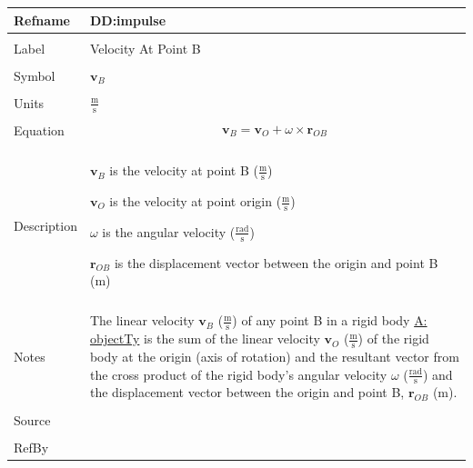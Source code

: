 \documentclass[12pt]{article}
\begin{document}
\noindent \begin{minipage}{\textwidth}
\begin{tabular}{p{} p{}}
\toprule \textbf{Refname} & \textbf{DD:impulse}
\label{DD:impulse}
\\ \midrule \\
Label & Velocity At Point B
\\ \midrule \\
Symbol & ${\mathbf{v}_{B}}$
\\ \midrule \\
Units & $\frac{\text{m}}{\text{s}}$
\\ \midrule \\
Equation & \begin{dmath}
           {\mathbf{v}_{B}}={\mathbf{v}_{O}}+ω\times{\mathbf{r}_{OB}}
           \end{dmath}
\\ \midrule \\
Description & \begin{symbDescription}
              \item{${\mathbf{v}_{B}}$ is the velocity at point B ($\frac{\text{m}}{\text{s}}$)}
              \item{${\mathbf{v}_{O}}$ is the velocity at point origin ($\frac{\text{m}}{\text{s}}$)}
              \item{$ω$ is the angular velocity ($\frac{\text{rad}}{\text{s}}$)}
              \item{${\mathbf{r}_{OB}}$ is the displacement vector between the origin and point B (m)}
              \end{symbDescription}
\\ \midrule \\
Notes & The linear velocity ${\mathbf{v}_{B}}$ ($\frac{\text{m}}{\text{s}}$) of any point B in a rigid body \hyperref[A:objectTy]{A: objectTy} is the sum of the linear velocity ${\mathbf{v}_{O}}$ ($\frac{\text{m}}{\text{s}}$) of the rigid body at the origin (axis of rotation) and the resultant vector from the cross product of the rigid body's angular velocity $ω$ ($\frac{\text{rad}}{\text{s}}$) and the displacement vector between the origin and point B, ${\mathbf{r}_{OB}}$ (m).
\\ \midrule \\
Source & 
\\ \midrule \\
RefBy & 
\\ \bottomrule \end{tabular}
\end{minipage}\\
\end{document}

